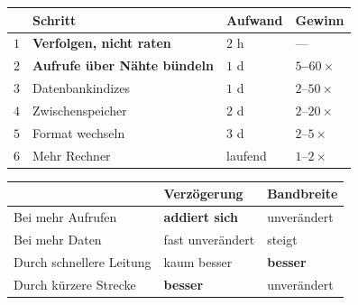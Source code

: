 \begin{aufgabe}
\begin{center}
{\small
\renewcommand{\arraystretch}{1.45}
\begin{tabular}{@{}P{1.0cm}P{3.2cm}P{2.0cm}P{2.2cm}@{}}
\toprule
& \textbf{Schritt} & \textbf{Aufwand} & \textbf{Gewinn}\\
\midrule
$1$ & \textbf{Verfolgen, nicht raten} & \textcolor{gruen}{$2$ h} & --- \\
$2$ & \textbf{Aufrufe über Nähte bündeln} & \textcolor{gruen}{$1$ d} & \textcolor{gruen}{\textbf{$5$--$60\times$}}\\
$3$ & Datenbankindizes & $1$ d & $2$--$50\times$\\
$4$ & Zwischenspeicher & $2$ d & $2$--$20\times$\\
$5$ & Format wechseln & $3$ d & $2$--$5\times$\\
$6$ & Mehr Rechner & \textcolor{akzent}{laufend} & \textcolor{akzent}{$1$--$2\times$}\\
\bottomrule
\end{tabular}}
\end{center}

\begin{center}
\begin{minipage}{0.88\textwidth}
\end{minipage}
\end{center}

\begin{center}
\end{center}

\begin{warnung}
\begin{center}
\renewcommand{\arraystretch}{1.5}
\begin{tabular}{@{}P{2.8cm}P{2.4cm}P{2.8cm}@{}}
\toprule
& \textbf{Verzögerung} & \textbf{Bandbreite}\\
\midrule
Bei mehr Aufrufen & \textcolor{akzent}{\textbf{addiert sich}} & \textcolor{gruen}{unverändert}\\
Bei mehr Daten & \textcolor{gruen}{fast unverändert} & \textcolor{akzent}{steigt}\\
Durch schnellere Leitung & \textcolor{gruen}{kaum besser} & \textcolor{gruen}{\textbf{besser}}\\
Durch kürzere Strecke & \textcolor{gruen}{\textbf{besser}} & unverändert\\
\bottomrule
\end{tabular}
\end{center}


\end{warnung}
\end{aufgabe}
